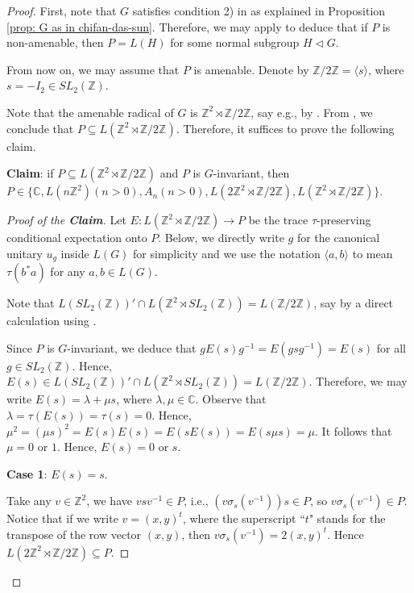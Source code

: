 \documentclass[12pt]{amsart}
\theoremstyle{definition}
\theoremstyle{remark}
\begin{document}
\begin{proof}
First, note that $G$ satisfies condition 2) in \cite[Theorem 5.1]{cds} as explained in Proposition \ref{prop: G as in chifan-das-sun}. Therefore, we may apply \cite[Theorem 5.1]{cds} to deduce that if $P$ is non-amenable, then $P=L(H)$ for some normal subgroup $H\lhd G$.

From now on, we may assume that $P$ is amenable. Denote by $\mathbb{Z}/{2\mathbb{Z}}=\langle s \rangle$, where $s=-I_2\in SL_2(\mathbb{Z})$. 

Note that the amenable radical of $G$ is $\mathbb{Z}^2\rtimes \mathbb{Z}/{2\mathbb{Z}}$, say e.g., by \cite[Proposition 2.10]{jiangskalski}. 
From \cite[Theorem A]{aho}, we conclude that $P\subseteq L(\mathbb{Z}^2\rtimes \mathbb{Z}/{2\mathbb{Z}})$. Therefore, it suffices to prove the following claim. 

\textbf{Claim}: if $P\subseteq L(\mathbb{Z}^2\rtimes \mathbb{Z}/{2\mathbb{Z}})$ and $P$ is $G$-invariant, then $P\in\{\mathbb{C}, L(n\mathbb{Z}^2)(n>0), A_n(n>0), L(2\mathbb{Z}^2\rtimes \mathbb{Z}/{2\mathbb{Z}}), L(\mathbb{Z}^2\rtimes \mathbb{Z}/{2\mathbb{Z}})\}$.
\begin{proof}[Proof of the \textbf{Claim}]
Let $E: L(\mathbb{Z}^2\rtimes \mathbb{Z}/{2\mathbb{Z}})\rightarrow P$ be the trace $\tau$-preserving conditional expectation onto $P$. Below, we directly write $g$ for the canonical unitary $u_g$ inside $L(G)$ for simplicity and we use the notation $\langle a, b \rangle$ to mean $\tau(b^*a)$  for any $a, b\in L(G)$.

Note that $L(SL_2(\mathbb{Z}))'\cap L(\mathbb{Z}^2\rtimes SL_2(\mathbb{Z}))=L(\mathbb{Z}/{2\mathbb{Z}})$, say by a direct calculation using \cite[Lemma 2.7]{aj}.

Since $P$ is $G$-invariant, we deduce that $gE(s)g^{-1}=E(gsg^{-1})=E(s)$ for all $g\in SL_2(\mathbb{Z})$. Hence, 
$E(s)\in L(SL_2(\mathbb{Z}))'\cap L(\mathbb{Z}^2\rtimes SL_2(\mathbb{Z}))=L(\mathbb{Z}/{2\mathbb{Z}})$. Therefore, we may write $E(s)=\lambda+\mu s$, where $\lambda,\mu\in\mathbb{C}$. Observe that $\lambda=\tau(E(s))=\tau(s)=0$. Hence, $\mu^2=(\mu s)^2=E(s)E(s)=E(sE(s))=E(s\mu s)=\mu$. It follows that $\mu=0$ or $1$. Hence, $E(s)=0$ or $s$.

\textbf{Case 1}: $E(s)=s$.

Take any $v\in\mathbb{Z}^2$, we have $vsv^{-1}\in P$, i.e., $(v\sigma_s(v^{-1}))s\in P$, so $v\sigma_s(v^{-1})\in P$. Notice that if we write $v=(x, y)^t$, where the superscript ``$t$" stands for the transpose of the row vector $(x, y)$, then $v\sigma_s(v^{-1})=2(x,y)^t$. Hence $L(2\mathbb{Z}^2\rtimes \mathbb{Z}/{2\mathbb{Z}})\subseteq P$.


\end{proof}
\end{proof}
\end{document}
